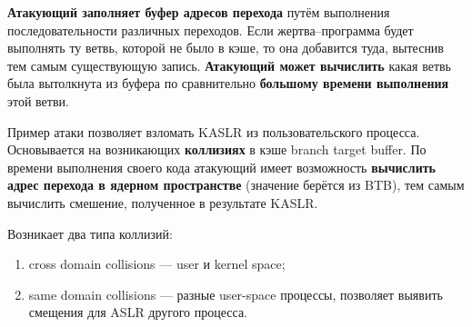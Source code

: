 \begin{frame}{\insertsubsection}
{    \textbf{Атакующий заполняет буфер адресов перехода} путём выполнения
    последовательности различных переходов. Если жертва--программа будет
    выполнять ту ветвь, которой не было в кэше, то она добавится туда, вытеснив
    тем самым существующую запись. \textbf{Атакующий может вычислить} какая
    ветвь была вытолкнута из буфера по сравнительно \textbf{большому времени
      выполнения} этой ветви.

    Пример атаки позволяет взломать KASLR из пользовательского процесса.
    Основывается на возникающих \textbf{коллизиях} в кэше branch target buffer.
    По времени выполнения своего кода атакующий имеет возможность
    \textbf{вычислить адрес перехода в ядерном пространстве} (значение берётся
    из BTB), тем самым вычислить смешение, полученное в результате KASLR.

    Возникает два типа коллизий:

    \begin{enumerate}
    \item cross domain collisions --- user и kernel space;
    \item same domain collisions --- разные user-space процессы, позволяет
      выявить смещения для ASLR другого процесса.
    \end{enumerate}

  }

\end{frame}